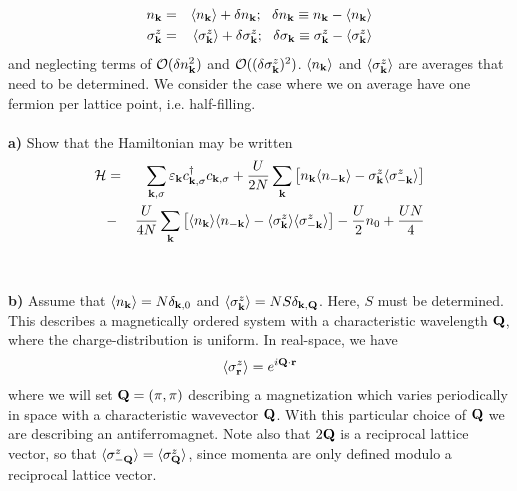 \begin{problem}
\begin{eqnarray}
	n_{\bf k} & = & \langle n_{\bf k} \rangle + \delta n_{\bf k}; ~~  \delta n_{\bf k} \equiv n_{\bf k} - \langle n_{\bf k} \rangle \nonumber  \\
	\sigma^z_{\bf k} & = & \langle \sigma^z_{\bf k} \rangle + \delta \sigma^z_{\bf k}; ~~  \delta \sigma_{\bf k} \equiv \sigma^z_{\bf k} - \langle \sigma^z_{\bf k} \rangle \nonumber  
\end{eqnarray}
and neglecting terms of ${\cal O}(\delta n_{\bf k}^2) $ and  ${\cal O}((\delta \sigma^z_{\bf k})^2) $.
$\langle n_{\bf k} \rangle$  and $\langle \sigma^z_{\bf k} \rangle$ are averages that need to be determined. We consider the case where we on average have one fermion per lattice point, i.e. half-filling.
\ \\
\ \\
{\bf a)} Show that the Hamiltonian may be written 
\begin{eqnarray}
	\mathcal{H} & = & \sum_{{\bf k},\sigma}{ \varepsilon_{{\bf k}}}  c^{\dagger}_{{\bf k},\sigma} c_{{\bf k},\sigma}
	+ \frac{U}{2N} \sum_{{\bf k}} 
	\left[ n_{\bf k}  \langle n_{-\bf k} \rangle   - \sigma^z_{\bf k}  \langle \sigma^z_{-\bf k} \rangle  \right]  
	\\ &-&   \frac{U}{4N} \sum_{{\bf k}} 
	\left[ \langle n_{\bf k} \rangle  \langle  n_{-\bf k} \rangle   - \langle  \sigma^z_{\bf k} \rangle \langle \sigma^z_{-\bf k} \rangle  \right] 
	- \frac{U}{2}  n_{0}
	+\frac{U N}{4}
	\nonumber
\end{eqnarray}
\ \\
\ \\
{\bf b)} Assume that $\langle n_{\bf k} \rangle = N \delta_{{\bf k},0}$ and $ \langle \sigma^z_{\bf k} \rangle =  N S \delta_{{\bf k},{\bf Q}}$. Here, $S$ must be determined. This describes a magnetically ordered system with a characteristic wavelength ${\bf Q}$, where the charge-distribution is uniform. In real-space, we have
\begin{eqnarray}
	\langle \sigma^z_{\bf r} \rangle = e^{i {\bf Q} \cdot {\bf r}} \nonumber
\end{eqnarray}  
where we will set ${\bf Q}=(\pi,\pi)$
describing a magnetization which varies periodically in space with a characteristic wavevector ${\bf Q}$.  With this particular choice of ${\bf Q}$
we are describing an antiferromagnet. Note also that $2 {\bf Q}$ is a reciprocal lattice vector, so that 
$\langle  \sigma^z_{-\bf Q} \rangle  = \langle \sigma^z_{\bf Q} \rangle $, since momenta are only defined modulo a reciprocal lattice vector.

\end{problem}
